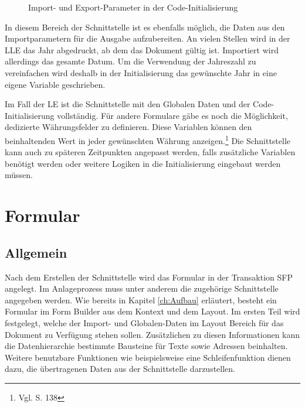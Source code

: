 \begin{figure}[ht]
	\centering
	\caption{Import- und Export-Parameter in der Code-Initialisierung}
	\label{figCo}
\end{figure}

In diesem Bereich der Schnittstelle ist es ebenfalls möglich, die Daten aus den Importparametern für die Ausgabe aufzubereiten. An vielen Stellen wird in der \ac{LLE} das Jahr abgedruckt, ab dem das Dokument gültig ist. Importiert wird allerdings das gesamte Datum. Um die Verwendung der Jahreszahl zu vereinfachen wird deshalb in der Initialisierung das gewünschte Jahr in eine eigene Variable geschrieben.

Im Fall der \ac{LE} ist die Schnittstelle mit den Globalen Daten und der Code-Initialisierung vollständig. Für andere Formulare gäbe es noch die Möglichkeit, dedizierte Währungsfelder zu definieren. Diese Variablen können den beinhaltenden Wert in jeder gewünschten Währung anzeigen.\footnote{Vgl. \cite{Hauser.2015} S. 138}
Die Schnittstelle kann auch zu späteren Zeitpunkten angepasst werden, falls zusätzliche Variablen benötigt werden oder weitere Logiken in die Initialisierung eingebaut werden müssen.
\FloatBarrier
\section{Formular}
\subsection{Allgemein}


Nach dem Erstellen der Schnittstelle wird das Formular in der Transaktion SFP angelegt. Im Anlageprozess muss unter anderem die zugehörige Schnittstelle angegeben werden. Wie bereits in Kapitel \ref{ch:Aufbau} erläutert, besteht ein Formular im Form Builder aus dem Kontext und dem Layout. Im ersten Teil wird festgelegt, welche der Import- und Globalen-Daten im Layout Bereich für das Dokument zu Verfügung stehen sollen. Zusätzlichen zu diesen Informationen kann die Datenhierarchie bestimmte Bausteine für Texte sowie Adressen beinhalten. Weitere benutzbare Funktionen wie beispielsweise eine Schleifenfunktion dienen dazu, die übertragenen Daten aus der Schnittstelle darzustellen.

